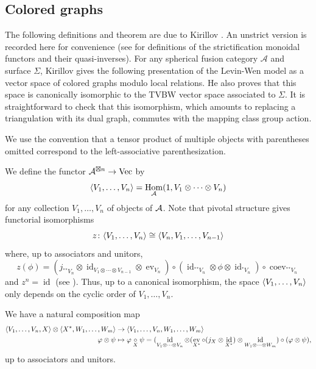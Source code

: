 \documentclass{amsart}
\newcommand{\lstar}{{^*}}
\DeclareMathOperator{\id}{id}
\DeclareMathOperator{\Vect}{Vec}
\DeclareMathOperator{\Hom}{Hom}
\DeclareMathOperator{\coev}{coev}
\DeclareMathOperator{\ev}{ev}
\newcommand{\one}{1}
\newcommand{\ph}{\varphi}
\newcommand{\Si}{\Sigma}
\begin{document}
\subsection{Colored graphs}\label{s:colored}

The following definitions and theorem are due to Kirillov
\cite{kirillovStringNets}.  An unstrict version is recorded here for convenience (see \cite{ns} for definitions of the strictification monoidal functors and their quasi-inverses).  For any spherical fusion category $\mathcal A$ and surface $\Si$, Kirillov gives the following presentation of the Levin-Wen model as a vector space of
colored graphs modulo local relations.  He also proves that this space
is canonically isomorphic to the TVBW vector space associated to
$\Si$.  It is straightforward to check that this isomorphism, which
amounts to replacing a triangulation with its dual graph, commutes
with the mapping class group action.

We use the convention that a tensor product of multiple objects with parentheses
omitted correspond to the left-associative parenthesization.

We define the functor $\A^{\boxtimes n}\to \Vect$ by
\begin{equation}\label{e:vev}
\<V_1,\dots,V_n\>=\Hom_\A(\one,
V_1\otimes\dots\otimes V_n)
\end{equation}
for any collection $V_1,\dots, V_n$ of objects of $\mathcal{A}$. Note that pivotal
structure gives functorial isomorphisms
\begin{equation}\label{e:cyclic}
z\colon\langle V_1,\dots,V_n\rangle\cong \langle V_n, V_1,\dots,V_{n-1}\rangle
\end{equation}
where, up to associators and unitors,
$$z(\phi)= (j_{\lstar \lstar V_n} \otimes \id_{V_1 \otimes \cdots \otimes V_{n-1}} \otimes \ev_{V_n} ) \circ (\id_{\lstar \lstar V_n} \otimes \phi \otimes \id_{\lstar V_n} ) \circ  \coev_{\lstar \lstar V_n}  $$ 
and $z^n=\id$ (see \cite[Section 5.3]{BK}). Thus, up to a canonical
isomorphism, the space $\langle V_1,\dots,V_n\rangle$ only depends on the cyclic order
of $V_1,\dots, V_n$.

We have a natural composition map 
\begin{equation}\label{e:composition}
\begin{aligned}
 \<V_1,\dots,V_n, X\> \otimes \<X^*, W_1,\dots,
W_m\>&\to\<V_1,\dots,V_n, W_1,\dots, W_m\> \\
\ph\otimes\psi & \mapsto \ph\cc{X}\psi= (\id_{V_1 \otimes \cdots \otimes V_{n}} \otimes (\ev_{X^*} \circ (j_X \otimes \id_{X^*}  )\otimes \id_{W_1 \otimes \cdots \otimes W_{m}} )\circ (\ph\otimes\psi),
\end{aligned}
\end{equation}
up to associators and unitors.  %
\end{document}
